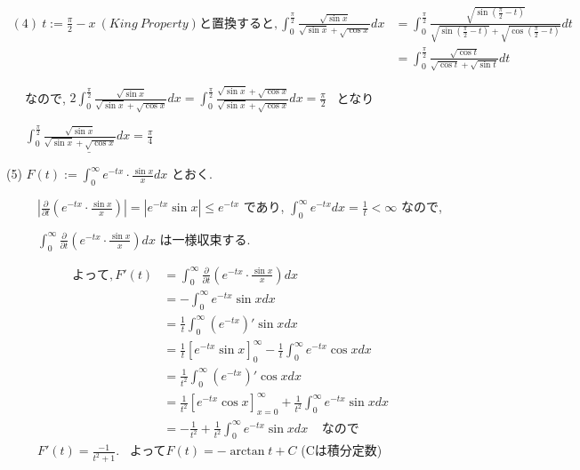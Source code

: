 \documentclass{jsarticle}
\begin{document}
\begin{align*}
(4) \ t := \displaystyle \frac{\pi}{2} - x \ (King \ Property) と置換すると,
\displaystyle \int_0^{\frac{\pi}{2}} \frac{\sqrt{\sin x}}{\sqrt{\sin x} + \sqrt{\cos x}} dx 
&= \displaystyle \int_0^{\frac{\pi}{2}} \frac{\sqrt{\sin (\frac{\pi}{2} - t)}}{\sqrt{\sin (\frac{\pi}{2} - t)} + \sqrt{\cos (\frac{\pi}{2} - t)}} dt \\
&= \displaystyle \int_0^{\frac{\pi}{2}} \frac{\sqrt{\cos t}}{\sqrt{\cos t} + \sqrt{\sin t}} dt 
\end{align*}

\ \ \ なので, $2\displaystyle \int_0^{\frac{\pi}{2}} \frac{\sqrt{\sin x}}{\sqrt{\sin x} + \sqrt{\cos x}} dx
= \displaystyle \int_0^{\frac{\pi}{2}} \frac{\sqrt{\sin x} + \sqrt{\cos x}}{\sqrt{\sin x} + \sqrt{\cos x}} dx
= \displaystyle \frac{\pi}{2}$ \ となり

\ \ \ $\underline{\displaystyle \int_0^{\frac{\pi}{2}} \frac{\sqrt{\sin x}}{\sqrt{\sin x} + \sqrt{\cos x}} dx
= \displaystyle \frac{\pi}{4} }$

\bigskip
\bigskip
\bigskip
\bigskip
\bigskip
\bigskip
\bigskip

(5) $F(t) := \displaystyle \int_0^{\infty} e^{-tx}\cdot \frac{\sin x}{x} dx$ とおく.

\ \ \ \ \ $\displaystyle \left| \frac{\partial}{\partial t} \left(e^{-tx}\cdot \frac{\sin x}{x} \right) \right| = |e^{-tx} \sin x| \le e^{-tx}$ であり, $\displaystyle \int_0^{\infty} e^{-tx} dx = \frac{1}{t} < \infty$ なので, 
  
\ \ \ \ \ $\displaystyle \int_0^{\infty} \frac{\partial}{\partial t} \left(e^{-tx}\cdot \frac{\sin x}{x} \right) dx$ は一様収束する.
  
\begin{align*}
よって, F'(t)
&=\displaystyle \int_0^{\infty} \frac{\partial}{\partial t} \left(e^{-tx}\cdot \frac{\sin x}{x} \right) dx \\
&= -\displaystyle \int_0^{\infty} e^{-tx} \sin x dx \\
&= \displaystyle \frac{1}{t} \int_0^{\infty} (e^{-tx})' \sin x dx \\
&= \displaystyle \frac{1}{t} \left[e^{-tx} \sin x \right]_0^{\infty} - \displaystyle \frac{1}{t} \int_0^{\infty} e^{-tx} \cos x dx \\
&= \displaystyle \frac{1}{t^2} \int_0^{\infty} (e^{-tx})' \cos x dx \\
&= \displaystyle \frac{1}{t^2} \left[e^{-tx} \cos x \right]_{x=0}^{\infty} + \displaystyle \frac{1}{t^2} \int_0^{\infty} e^{-tx} \sin x dx \\
&= -\displaystyle \frac{1}{t^2} + \displaystyle \frac{1}{t^2} \int_0^{\infty} e^{-tx} \sin x dx \ \ \ \ \ なので
\end{align*}
\ \ \ \ \ $F'(t) = \displaystyle \frac{-1}{t^2+1}$. \ よって$F(t) = -\arctan t + C$ (Cは積分定数)
\end{document}
